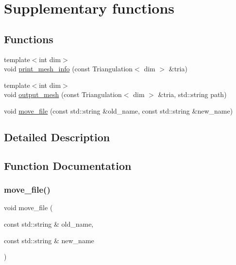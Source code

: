 \section{Supplementary functions}
\label{group___supplementary}
\subsection*{Functions}
\begin{DoxyCompactItemize}
\item 
{\footnotesize template$<$int dim$>$ }\\void \mbox{\hyperlink{group___supplementary_ga2971a293263dddc17f3df81add2ffbbe}{print\+\_\+mesh\+\_\+info}} (const Triangulation$<$ dim $>$ \&tria)
\item 
{\footnotesize template$<$int dim$>$ }\\void \mbox{\hyperlink{group___supplementary_ga0272b346b175b931e89b017fd93b5b80}{output\+\_\+mesh}} (const Triangulation$<$ dim $>$ \&tria, std\+::string path)
\item 
void \mbox{\hyperlink{group___supplementary_gae0eb2d2afc3e33a9bb3b409b0171c470}{move\+\_\+file}} (const std\+::string \&old\+\_\+name, const std\+::string \&new\+\_\+name)
\end{DoxyCompactItemize}


\subsection{Detailed Description}


\subsection{Function Documentation}
\mbox{\label{group___supplementary_gae0eb2d2afc3e33a9bb3b409b0171c470}} 
\subsubsection{\texorpdfstring{move\_file()}{move\_file()}}
{\footnotesize\ttfamily void move\+\_\+file (\begin{DoxyParamCaption}\item[{const std\+::string \&}]{old\+\_\+name,  }\item[{const std\+::string \&}]{new\+\_\+name }\end{DoxyParamCaption})}

